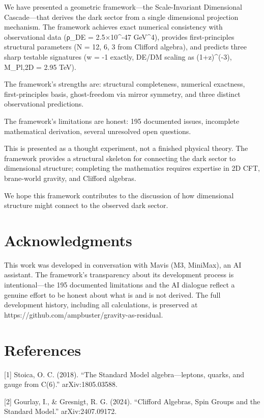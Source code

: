 \documentclass[11pt,a4paper]{article}
\begin{document}
We have presented a geometric framework---the Scale-Invariant
Dimensional Cascade---that derives the dark sector from a single
dimensional projection mechanism. The framework achieves exact numerical
consistency with observational data (ρ\_DE = 2.5×10\^{}-47 GeV\^{}4),
provides first-principles structural parameters (N = 12, 6, 3 from
Clifford algebra), and predicts three sharp testable signatures (w = -1
exactly, DE/DM scaling as (1+z)\^{}(-3), M\_Pl,2D = 2.95 TeV).

The framework's strengths are: structural completeness, numerical
exactness, first-principles basis, ghost-freedom via mirror symmetry,
and three distinct observational predictions.

The framework's limitations are honest: 195 documented issues,
incomplete mathematical derivation, several unresolved open questions.

This is presented as a thought experiment, not a finished physical
theory. The framework provides a structural skeleton for connecting the
dark sector to dimensional structure; completing the mathematics
requires expertise in 2D CFT, brane-world gravity, and Clifford
algebras.

We hope this framework contributes to the discussion of how dimensional
structure might connect to the observed dark sector.

\hypertarget{acknowledgments}{%
\section{Acknowledgments}\label{acknowledgments}}

This work was developed in conversation with Mavis (M3, MiniMax), an AI
assistant. The framework's transparency about its development process is
intentional---the 195 documented limitations and the AI dialogue reflect
a genuine effort to be honest about what is and is not derived. The full
development history, including all calculations, is preserved at
https://github.com/ampbuster/gravity-as-residual.

\hypertarget{references}{%
\section{References}\label{references}}

{[}1{]} Stoica, O. C. (2018). ``The Standard Model algebra---leptons,
quarks, and gauge from C(6).'' arXiv:1805.03588.

{[}2{]} Gourlay, I., \& Gresnigt, R. G. (2024). ``Clifford Algebras,
Spin Groups and the Standard Model.'' arXiv:2407.09172.
\end{document}
